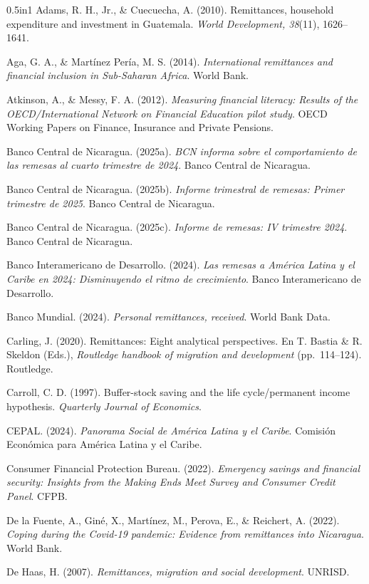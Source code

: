 \documentclass[12pt,letterpaper]{article}
\begin{document}
\begin{hangparas}{0.5in}{1}
Adams, R. H., Jr., \& Cuecuecha, A. (2010). Remittances, household expenditure and investment in Guatemala. \emph{World Development, 38}(11), 1626--1641.

Aga, G. A., \& Martínez Pería, M. S. (2014). \emph{International remittances and financial inclusion in Sub-Saharan Africa}. World Bank.

Atkinson, A., \& Messy, F. A. (2012). \emph{Measuring financial literacy: Results of the OECD/International Network on Financial Education pilot study}. OECD Working Papers on Finance, Insurance and Private Pensions.

Banco Central de Nicaragua. (2025a). \emph{BCN informa sobre el comportamiento de las remesas al cuarto trimestre de 2024}. Banco Central de Nicaragua.

Banco Central de Nicaragua. (2025b). \emph{Informe trimestral de remesas: Primer trimestre de 2025}. Banco Central de Nicaragua.

Banco Central de Nicaragua. (2025c). \emph{Informe de remesas: IV trimestre 2024}. Banco Central de Nicaragua.

Banco Interamericano de Desarrollo. (2024). \emph{Las remesas a América Latina y el Caribe en 2024: Disminuyendo el ritmo de crecimiento}. Banco Interamericano de Desarrollo.

Banco Mundial. (2024). \emph{Personal remittances, received}. World Bank Data.

Carling, J. (2020). Remittances: Eight analytical perspectives. En T. Bastia \& R. Skeldon (Eds.), \emph{Routledge handbook of migration and development} (pp.~114--124). Routledge.

Carroll, C. D. (1997). Buffer-stock saving and the life cycle/permanent income hypothesis. \emph{Quarterly Journal of Economics}.

CEPAL. (2024). \emph{Panorama Social de América Latina y el Caribe}. Comisión Económica para América Latina y el Caribe.

Consumer Financial Protection Bureau. (2022). \emph{Emergency savings and financial security: Insights from the Making Ends Meet Survey and Consumer Credit Panel}. CFPB.

De la Fuente, A., Giné, X., Martínez, M., Perova, E., \& Reichert, A. (2022). \emph{Coping during the Covid-19 pandemic: Evidence from remittances into Nicaragua}. World Bank.

De Haas, H. (2007). \emph{Remittances, migration and social development}. UNRISD.


\end{hangparas}
\end{document}
